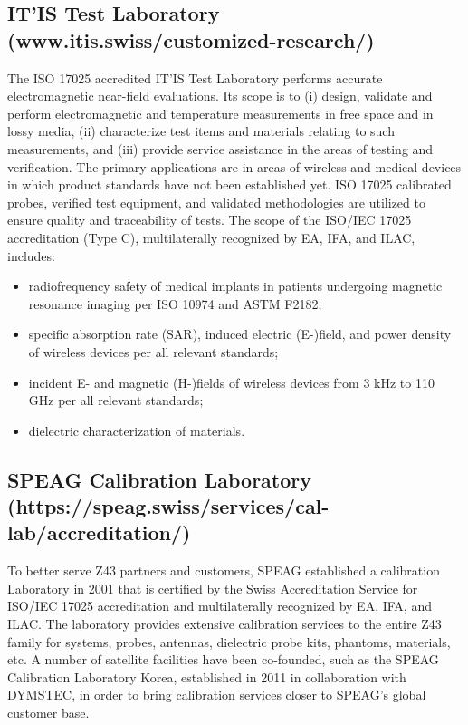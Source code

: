 \subsection*{IT'IS Test Laboratory (www.itis.swiss/customized-research/) }
The ISO 17025 accredited IT'IS Test Laboratory performs accurate electromagnetic near-field evaluations. Its scope is to (i) design, validate and perform electromagnetic and temperature measurements in free space and in lossy media, (ii) characterize test items and materials relating to such measurements, and (iii) provide service assistance in the areas of testing and verification. The primary applications are in areas of wireless and medical devices in which product standards have not been established yet. ISO 17025 calibrated probes, verified test equipment, and validated methodologies are utilized to ensure quality and traceability of tests. The scope of the ISO/IEC 17025 accreditation (Type C), multilaterally recognized by EA, IFA, and ILAC, includes:
\begin{itemize}
\item radiofrequency safety of medical implants in patients undergoing magnetic resonance imaging per ISO 10974 and ASTM F2182;
\item specific absorption rate (SAR), induced electric (E-)field, and power density of wireless devices per all relevant standards;
\item incident E- and magnetic (H-)fields of wireless devices from 3 kHz to 110 GHz per all relevant standards;
\item dielectric characterization of materials.
\end{itemize}

\subsection*{SPEAG Calibration Laboratory (https://speag.swiss/services/cal-lab/accreditation/)}
To better serve Z43 partners and customers, SPEAG established a calibration Laboratory in 2001 that is certified by the Swiss Accreditation Service for ISO/IEC 17025 accreditation and multilaterally recognized by EA, IFA, and ILAC. The laboratory provides extensive calibration services to the entire Z43 family for systems, probes, antennas, dielectric probe kits, phantoms, materials, etc. A number of satellite facilities have been co-founded, such as the SPEAG Calibration Laboratory Korea, established in 2011 in collaboration with DYMSTEC, in order to bring calibration services closer to SPEAG’s global customer base. 